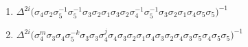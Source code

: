 \begin{enumerate}
    \item $\displaystyle \Delta^{2i} \big( \allowbreak\sigma_{4}\allowbreak\sigma_{2}\allowbreak\sigma_{5}^{-1}\allowbreak\sigma_{5}^{-1}\allowbreak\sigma_{3}\allowbreak\sigma_{2}\allowbreak\sigma_{1}\allowbreak\sigma_{3}\allowbreak\sigma_{2}\allowbreak\sigma_{4}^{-1}\allowbreak\sigma_{5}^{-1}\allowbreak\sigma_{3}\allowbreak\sigma_{2}\allowbreak\sigma_{1}\allowbreak\sigma_{4}\allowbreak\sigma_{5}\allowbreak\sigma_{5} \big)^{-1}$
    \item $\displaystyle \Delta^{2i} \big( \allowbreak\sigma_{4}^m\allowbreak\sigma_{3}\allowbreak\sigma_{4}\allowbreak\sigma_{5}^{-k}\allowbreak\sigma_{3}\allowbreak\sigma_{3}\allowbreak\sigma_{4}^j\allowbreak\sigma_{4}\allowbreak\sigma_{3}\allowbreak\sigma_{2}\allowbreak\sigma_{1}\allowbreak\sigma_{4}\allowbreak\sigma_{3}\allowbreak\sigma_{2}\allowbreak\sigma_{4}\allowbreak\sigma_{3}\allowbreak\sigma_{5}\allowbreak\sigma_{4}\allowbreak\sigma_{5}\allowbreak\sigma_{5} \big)^{-1}$
    
    \pagebreak
    

\end{enumerate}
